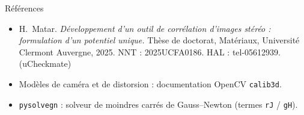 \documentclass[aspectratio=169,11pt]{beamer}
\newcommand{\code}[1]{\texttt{\small #1}}
\begin{document}
\begin{frame}{Références}
  \small
  \begin{itemize}
    \item H.~Matar. \emph{Développement d'un outil de corrélation d'images stéréo :
          formulation d'un potentiel unique.} Thèse de doctorat, Matériaux,
          Université Clermont Auvergne, 2025. NNT : 2025UCFA0186.
          HAL : tel-05612939. \hfill (\alert{uCheckmate})
    \item Modèles de caméra et de distorsion : documentation OpenCV
          \texttt{calib3d}.
    \item \texttt{pysolvegn} : solveur de moindres carrés de Gauss--Newton (termes
          \code{rJ} / \code{gH}).
  \end{itemize}
\end{frame}
 
\end{document}
